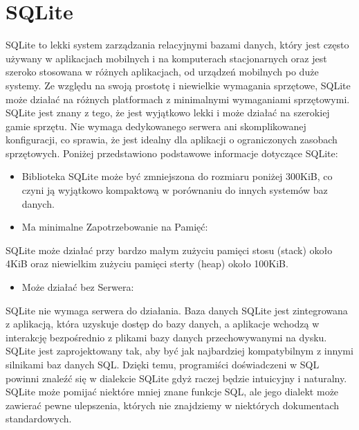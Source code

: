 \documentclass[letterpaper,10pt,polish]{sphinxmanual}
\begin{document}
\chapter{SQLite}
\label{\detokenize{DB-Report/Bazy Danych Rozdzia_u0142 1/Pod_rozdzia_u0142_2:sqlite}}\label{\detokenize{DB-Report/Bazy Danych Rozdzia_u0142 1/Pod_rozdzia_u0142_2::doc}}
\sphinxAtStartPar
SQLite to lekki system zarządzania relacyjnymi bazami danych, który jest często używany w aplikacjach mobilnych i na komputerach stacjonarnych oraz jest szeroko stosowana w różnych aplikacjach, od urządzeń mobilnych po duże systemy. Ze względu na swoją prostotę i niewielkie wymagania sprzętowe, SQLite może działać na różnych platformach z minimalnymi wymaganiami sprzętowymi. SQLite jest znany z tego, że jest wyjątkowo lekki i może działać na szerokiej gamie sprzętu. Nie wymaga dedykowanego serwera ani skomplikowanej konfiguracji, co sprawia, że jest idealny dla aplikacji o ograniczonych zasobach sprzętowych. Poniżej przedstawiono podstawowe  informacje dotyczące SQLite:
\begin{itemize}
\item {} 
\sphinxAtStartPar
Biblioteka SQLite może być zmniejszona do rozmiaru poniżej 300KiB, co czyni ją wyjątkowo kompaktową w porównaniu do innych systemów baz danych.

\item {} 
\sphinxAtStartPar
Ma minimalne Zapotrzebowanie na Pamięć:

\end{itemize}

\sphinxAtStartPar
SQLite może działać przy bardzo małym zużyciu pamięci stosu (stack) \sphinxhyphen{} około 4KiB oraz niewielkim zużyciu pamięci sterty (heap) \sphinxhyphen{} około 100KiB.
\begin{itemize}
\item {} 
\sphinxAtStartPar
Może działać bez Serwera:

\end{itemize}

\sphinxAtStartPar
SQLite nie wymaga serwera do działania. Baza danych SQLite jest zintegrowana z aplikacją, która uzyskuje dostęp do bazy danych, a aplikacje wchodzą w interakcję bezpośrednio z plikami bazy danych przechowywanymi na dysku. SQLite jest zaprojektowany tak, aby być jak najbardziej kompatybilnym z innymi silnikami baz danych SQL. Dzięki temu, programiści doświadczeni w SQL powinni znaleźć się w  dialekcie  SQLite gdyż raczej będzie intuicyjny i naturalny. SQLite może pomijać niektóre mniej znane funkcje SQL, ale jego dialekt może zawierać pewne ulepszenia, których nie znajdziemy w niektórych dokumentach standardowych.
\end{document}
